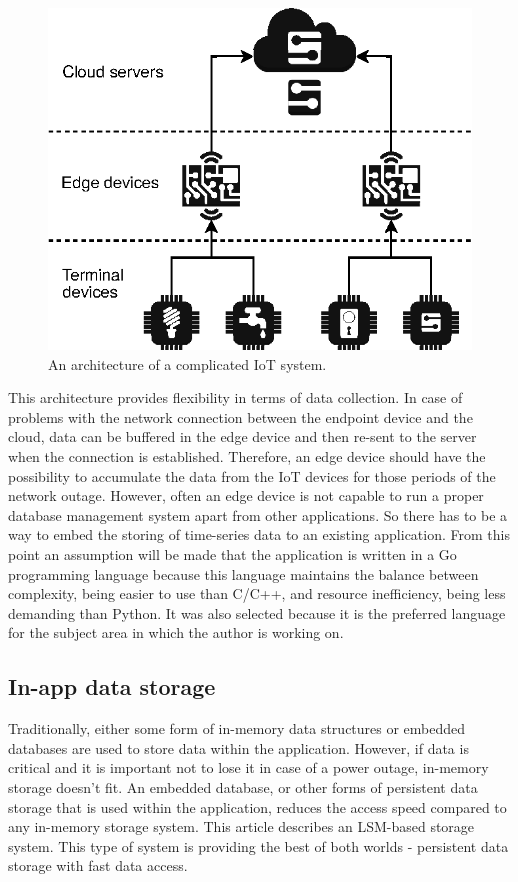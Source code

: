 \begin{figure}[htb]
\centering
\includegraphics{figures/iot-hierarchy.drawio.eps}
\caption{An architecture of a complicated IoT system.} \label{fig1}
\end{figure}

This architecture provides flexibility in terms of data collection.
In case of problems with the network connection between the endpoint device and the cloud, data can be buffered in the edge device and then re-sent to the server when the connection is established. Therefore, an edge device should have the possibility to accumulate the data from the IoT devices for those periods of the network outage. However, often an edge device is not capable to run a proper database management system apart from other applications. So there has to be a way to embed the storing of time-series data to an existing application. From this point an assumption will be made that the application is written in a Go programming language because this language maintains the balance between complexity, being easier to use than C/C++, and resource inefficiency, being less demanding than Python. It was also selected because it is the preferred language for the subject area in which the author is working on.

\subsection{In-app data storage}
Traditionally, either some form of in-memory data structures or embedded databases are used to store data within the application. However, if data is critical and it is important not to lose it in case of a power outage, in-memory storage doesn't fit. An embedded database, or other forms of persistent data storage that is used within the application, reduces the access speed compared to any in-memory storage system. This article describes an LSM-based storage system. This type of system is providing the best of both worlds - persistent data storage with fast data access.